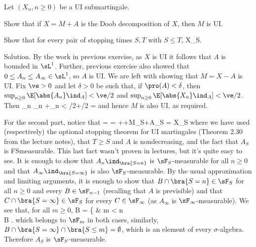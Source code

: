\item Let $(X_n, n \geq  0)$ be a UI submartingale.
\ben
\item [(i)] Show that if $X = M + A$ is the Doob decomposition of $X$, then $M$ is UI.
\item [(ii)] Show that for every pair of stopping times $S, T$ with $S \leq T$,
\be
\E[X_T |\sF_S] \geq  X_S.
\ee
\een

\scutline

Solution. By the work in previous exercise, as $X$ is UI it follows that $A$ is bounded in $\sL^1$. Further, previous exercise also showed that $0 \leq  A_n \leq  A_\infty \in \sL^1$, so $A$ is UI. We are left with showing that $M = X -A$ is UI. Fix $\ve > 0$ and let $\delta > 0$ be such that, if $\pro(A) < \delta$, then $\sup_{n\geq 0}\E[\abs{A_n}\ind_A] < \ve/2$ and $\sup_{n\geq 0}\E[\abs{X_n}\ind_A] < \ve/2$. Then
\be
\sup_{n}  \leq \sup_{n} +\sup_{n}  < \ve/2+\ve/2 = \ve
\ee
and hence $M$ is also UI, as required.

For the second part, notice that
\be
\E[X_T |\sF_S] = \E[A_T +M_T |\sF_S] = \E[M_T |\sF_S]+\E[A_T -A_S|\sF_S]+\E[A_S|\sF_S] \geq M_S+A_S = X_S
\ee
where we have used (respectively) the optional stopping theorem for UI martingales (Theorem 2.30 from the lecture notes), that $T \geq S$ and $A$ is nondecreasing, and the fact that $A_S$ is FSmeasurable. This last fact wasn't proven in lectures, but it's quite easy to see. It is enough to show that $A_n\ind_{\bra{S=n}}$ is $\sF_S$-measurable for all $n \geq 0$ and that $A_\infty\ind_{\bra{S=\infty}}$ is also $\sF_S$-measurable. By the usual approximation and limiting arguments, it is enough to show that $B\cap \bra{S = n} \in \sF_S$ for all $n \geq 0$ and every $B \in \sF_{n-1}$ (recalling that $A$ is previsible) and that $C\cap \bra{S = \infty}\in \sF_S$ for every $C \in \sF_\infty$ (as $A_\infty$ is $\sF_\infty$-measurable). We see that, for all $m \geq  0$,
\be
B\cap {} \cap {} = \left\{
\emptyset & m < n\\
B\cap {}\qquad {}
\ea\right.
\ee
which belongs to $\sF_m$ in both cases, similarly, $B\cap \bra{S = \infty} \cap \bra{S \leq m} = \emptyset$, which is an element of every $\sigma$-algebra. Therefore $A_S$ is $\sF_S$-measurable.

\vspace{2mm}

\qcutline


